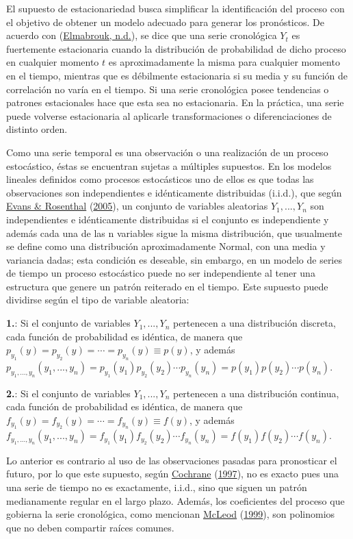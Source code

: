 \documentclass[
]{article}
\begin{document}
El supuesto de estacionariedad busca simplificar la identificación del
proceso con el objetivo de obtener un modelo adecuado para generar los
pronósticos. De acuerdo con
(\protect\hyperlink{ref-definicion_estocastico}{Elmabrouk, n.d.}), se
dice que una serie cronológica \(Y_t\) es fuertemente estacionaria
cuando la distribución de probabilidad de dicho proceso en cualquier
momento \(t\) es aproximadamente la misma para cualquier momento en el
tiempo, mientras que es débilmente estacionaria si su media y su función
de correlación no varía en el tiempo. Si una serie cronológica posee
tendencias o patrones estacionales hace que esta sea no estacionaria. En
la práctica, una serie puede volverse estacionaria al aplicarle
transformaciones o diferenciaciones de distinto orden.

Como una serie temporal es una observación o una realización de un
proceso estocástico, éstas se encuentran sujetas a múltiples supuestos.
En los modelos lineales definidos como procesos estocásticos uno de
ellos es que todas las observaciones son independientes e idénticamente
distribuidas (i.i.d.), que según
\protect\hyperlink{ref-definicion_iid}{Evans \& Rosenthal}
(\protect\hyperlink{ref-definicion_iid}{2005}), un conjunto de variables
aleatorias \(Y_1,...,Y_n\) son independientes e idénticamente
distribuidas si el conjunto es independiente y además cada una de las n
variables sigue la misma distribución, que usualmente se define como una
distribución aproximadamente Normal, con una media y variancia dadas;
esta condición es deseable, sin embargo, en un modelo de series de
tiempo un proceso estocástico puede no ser independiente al tener una
estructura que genere un patrón reiterado en el tiempo. Este supuesto
puede dividirse según el tipo de variable aleatoria:

\textbf{1.}: Si el conjunto de variables \(Y_1,...,Y_n\) pertenecen a
una distribución discreta, cada función de probabilidad es idéntica, de
manera que \(p_{y_1}(y)=p_{y_2}(y)=\cdots=p_{y_n}(y)\equiv p(y)\), y
además
\(p_{y_1,...,y_n}(y_1,...,y_n)=p_{y_1}(y_1)p_{y_2}(y_2)\cdots p_{y_n}(y_n)=p(y_1)p(y_2)\cdots p(y_n)\).

\textbf{2.}: Si el conjunto de variables \(Y_1,...,Y_n\) pertenecen a
una distribución continua, cada función de probabilidad es idéntica, de
manera que \(f_{y_1}(y)=f_{y_2}(y)=\cdots=f_{y_n}(y)\equiv f(y)\), y
además
\(f_{y_1,...,y_n}(y_1,...,y_n)=f_{y_1}(y_1)f_{y_2}(y_2)\cdots f_{y_n}(y_n)=f(y_1)f(y_2)\cdots f(y_n)\).

Lo anterior es contrario al uso de las observaciones pasadas para
pronosticar el futuro, por lo que este supuesto, según
\protect\hyperlink{ref-Cochrane}{Cochrane}
(\protect\hyperlink{ref-Cochrane}{1997}), no es exacto pues una una
serie de tiempo no es exactamente, i.i.d., sino que siguen un patrón
medianamente regular en el largo plazo. Además, los coeficientes del
proceso que gobierna la serie cronológica, como mencionan
\protect\hyperlink{ref-invertible_estacionario3}{McLeod}
(\protect\hyperlink{ref-invertible_estacionario3}{1999}), son polinomios
que no deben compartir raíces comunes.
\end{document}
